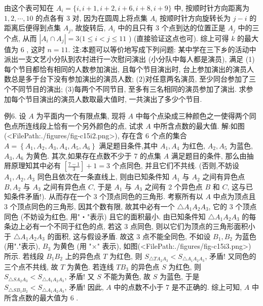 由这个表可知在 $A_i=\{i, i+1, i+2, i+6, i+8, i+9\}$ 中, 按顺时针方向距离为 $1,2, \cdots, 10$ 的点各有 3 对, 因为在圆周上将点集 $A_i$ 按顺时针方向旋转长为 $j-i$ 的距离后便得到点集 $A_j$, 故旋转后, $A_i$ 中的且只有 3 个点到达的位置正是 $A_j$ 中的三个点, 从而 $\left|A_i \cap A_j\right|=3(1 \leqslant i<j \leqslant 11$ ) (直接验证这点也可).
综上可得 $k$ 的最大值为 6 , 这时 $n=11$.
注:本题可以等价地写成下列问题: 某中学在三下乡的活动中派出一支文艺小分队到农村进行一次慰问演出 (小分队中每人都是演员), 满足
(1)每个节目都恰有相同的人数参加演出, 且每个节目演出时, 台上参加演出的演员人数总是多于台下没有参加演出的演员人数;
(2)对任意两名演员, 至少同台参加了三个不同节目的演出;
(3)每两个不同节目, 至多有三名相同的演员参加了演出.
求参加每个节目演出的演员人数取最大值时, 一共演出了多少个节目.



例6. 设 $A$ 为平面内一个有限点集, 现将 $A$ 中每个点染成三种颜色之一使得两个同色点所连线段上恰有一个另外颜色的点, 试求 $A$ 中所含点数的最大值.
解:如图(<FilePath:./figures/fig-c15i2.png>), 存在含 6 个点的集合 $A=\left\{A_1, A_2, A_3, A_4, A_5, A_6\right\}$ 满足题目条件,其中 $A_1, A_4$ 为红色, $A_2, A_5$ 为蓝色, $A_3, A_6$ 为黄色.
其次,如果存在点数不少于 7 的点集 $A$ 满足题目的条件, 那么由抽㞕原理知其中必有 $\left[\frac{7-1}{3}\right]+1=3$ 个点同色, 并且它们不共线.
(否则,不妨设 $A_1, A_2, A_3$ 同色且依次在一条直线上, 则由已知条件知 $A_1$ 与 $A_2$ 之间有异色点 $B, A_2$ 与 $A_3$ 之间有异色点 $C$, 于是 $A_1$ 与 $A_3$ 之间有 2 个异色点 $B$ 和 $C$, 这与已知条件矛盾!). 从而存在一个 3 个顶点同色的三角形.
考察所有以 $A$ 中点为顶点且 3 个顶点同色的三角形, 因其个数有限, 故其中必有一个 $\triangle A_1 A_2 A_3$, 它的 3 个顶点同色 (不妨设为红色, 用"・"表示) 且它的面积最小.
由已知条件知 $\triangle A_1 A_2 A_3$ 的每条边上必有一个不同于红色的点, 若这 3 点同色, 则以它们为顶点的三角形面积小于 $\triangle A_1 A_2 A_3$ 的面积, 这与假设矛盾.
故这 3 点不能全同色, 不如设 $B_1, B_2$ 为蓝色 (用"."表示), $B_3$ 为黄色 (用 "×" 表示), 如图(<FilePath:./figures/fig-c15i3.png>) 所示.
若线段 $B_1 B_2$ 上的异色点 $T$ 为红色, 则 $S_{\triangle T A_2 A_3}<S_{\triangle A_1 A_2 A_3}$, 矛盾! 又同色的三个点不共线, 故 $T$ 为黄色.
若连线 $T B_3$ 的异色点 $S$ 为红色, 则 $S_{\triangle S A_2 A_3}<S_{\triangle A_1 A_2 A_3}$, 矛盾! 又 $S$ 不能为黄色, 故 $S$ 为蓝色, 于是 $S_{\triangle S B_1 B_2}<S_{\triangle A_1 A_2 A_3}$, 矛盾! 因此, $A$ 中的点数不小于 7 是不正确的.
综上可知, $A$ 中所含点数的最大值为 6 .



